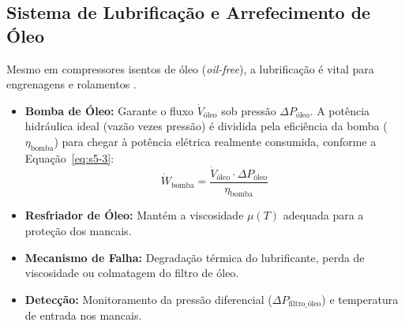 \documentclass[12pt,a4paper]{article}
\numberwithin{equation}{section}
\numberwithin{table}{section}
\numberwithin{figure}{section}
\begin{document}
{	\subsection{\textbf{Sistema de Lubrificação e Arrefecimento de Óleo}}
	Mesmo em compressores isentos de óleo (\textit{oil-free}), a lubrificação é vital para engrenagens e rolamentos \cite{hamrock}.
	\begin{itemize}
		\item \textbf{Bomba de Óleo:} Garante o fluxo $\dot{V}_{\text{óleo}}$ sob pressão $\Delta P_{\text{óleo}}$. A potência hidráulica ideal (vazão vezes pressão) é dividida pela eficiência da bomba ($\eta_{\text{bomba}}$) para chegar à potência elétrica realmente consumida, conforme a Equação~\eqref{eq:s5-3}:
		\begin{equation}\label{eq:s5-3}
 \dot{W}_{\text{bomba}} = \frac{\dot{V}_{\text{óleo}} \cdot \Delta P_{\text{óleo}}}{\eta_{\text{bomba}}}
\end{equation}
		\item \textbf{Resfriador de Óleo:} Mantém a viscosidade $\mu(T)$ adequada para a proteção dos mancais.
		\item \textbf{Mecanismo de Falha:} Degradação térmica do lubrificante, perda de viscosidade ou colmatagem do filtro de óleo.
		\item \textbf{Detecção:} Monitoramento da pressão diferencial ($\Delta P_{\text{filtro\_óleo}}$) e temperatura de entrada nos mancais.
	\end{itemize}
	
}
\end{document}

